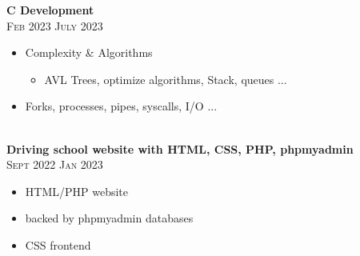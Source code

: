 \documentclass[oneside]{article}
\begin{document}
{\begin{minipage}[t][\dimexpr\textheight-2\fboxrule-2\fboxsep\relax][t]{\dimexpr0.6\textwidth-2\fboxrule-2\fboxsep\relax}
        {\large \textbf{C Development}} \\
        {\scshape{}\selectfont\footnotesize Feb 2023 \textendash{} July 2023} \\
        \vspace{-\baselineskip}
        \vspace{0.2cm}
        \begin{itemize}
            \setlength{\itemsep}{-5pt}
            \item Complexity \& Algorithms
            \begin{itemize}
                \item AVL Trees, optimize algorithms, Stack, queues ...
            \end{itemize}
            \item Forks, processes, pipes, syscalls, I/O ...
        \end{itemize} \\

        {\large \textbf{Driving school website with HTML, CSS, PHP, phpmyadmin}} \\
        {\scshape{}\selectfont\footnotesize Sept 2022 \textendash{} Jan 2023} \\
        \vspace{-\baselineskip}
        \vspace{0.2cm}
        \begin{itemize}
            \setlength{\itemsep}{-5pt}
            \item HTML/PHP website
            \item backed by phpmyadmin databases
            \item CSS frontend
        \end{itemize} \\
        
        \vfill%
    \end{minipage}
}%
\end{document}
